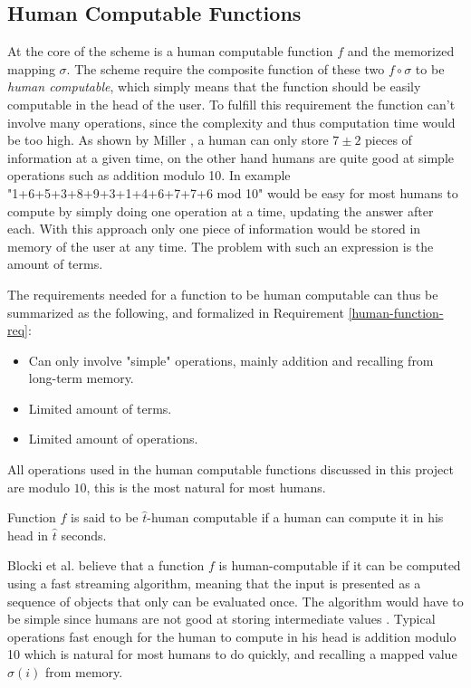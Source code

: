 \subsection{Human Computable Functions}\label{human-func}
At the core of the scheme is a human computable function $f$ and the memorized mapping $\sigma$. The scheme require the composite function of these two $f \circ \sigma$ to be \emph{human computable}, which simply means that the function should be easily computable in the head of the user. To fulfill this requirement the function can't involve many operations, since the complexity and thus computation time would be too high. As shown by Miller \cite{magic-seven_miller}, a human can only store $7 \pm 2$ pieces of information at a given time, on the other hand humans are quite good at simple operations such as addition modulo 10. In example "1+6+5+3+8+9+3+1+4+6+7+7+6 mod 10" would be easy for most humans to compute by simply doing one operation at a time, updating the answer after each. With this approach only one piece of information would be stored in memory of the user at any time. The problem with such an expression is the amount of terms. 
\par The requirements needed for a function to be human computable can thus be summarized as the following, and formalized in Requirement \ref{human-function-req}:
\begin{itemize}
    \item Can only involve "simple" operations, mainly addition and recalling from long-term memory.
    \item Limited amount of terms.
    \item Limited amount of operations.
\end{itemize}
\begin{remark}
    All operations used in the human computable functions discussed in this project are modulo $10$, this is the most natural for most humans.
\end{remark}
\begin{requirement}
    \label{human-function-req}
    Function $f$ is said to be $\hat t$-human computable if a human can compute it in his head in $\hat t$ seconds.
\end{requirement}

\par Blocki et al. \cite{hcp-blocki} believe that a function $f$ is human-computable if it can be computed using a fast streaming algorithm, meaning that the input is presented as a sequence of objects that only can be evaluated once. The algorithm would have to be simple since humans are not good at storing intermediate values \cite{magic-seven_miller}. Typical operations fast enough for the human to compute in his head is addition modulo 10 which is natural for most humans to do quickly, and recalling a mapped value $\sigma(i)$ from memory.

